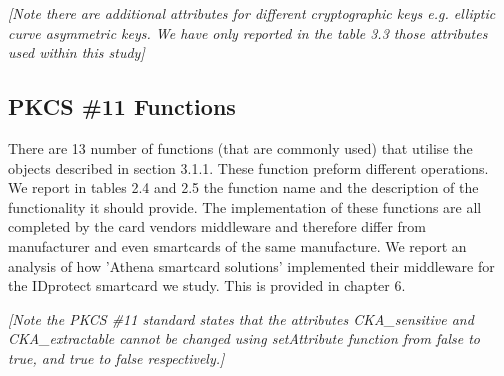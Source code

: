 \documentclass[bsc,frontabs,twoside,singlespacing,parskip,deptreport]{infthesis}     %
\begin{document}
\textit{[Note there are additional attributes for different cryptographic keys e.g. elliptic curve asymmetric keys. We have only reported in the table 3.3 those attributes used within this study]}

\subsection{PKCS \#11 Functions}

There are 13 number of functions (that are commonly used) that utilise the objects described in section 3.1.1. These function preform different operations. We report in tables 2.4 and 2.5 the function name and the description of the functionality it should provide. The implementation of these functions are all completed by the card vendors middleware and therefore differ from manufacturer and even smartcards of the same manufacture. We report an analysis of how 'Athena smartcard solutions' implemented their middleware for the IDprotect smartcard we study. This is provided in chapter 6.

\textit{[Note the PKCS \#11 standard states that the attributes CKA\_sensitive and CKA\_extractable cannot be changed using setAttribute function from false to true, and true to false respectively.]}
\end{document}
